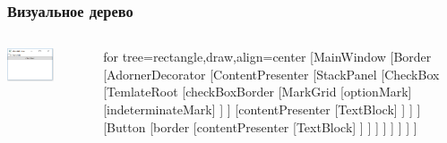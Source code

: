 \documentclass[xetex,mathserif,serif]{beamer}
\begin{document}
	\begin{frame}
		\frametitle{Визуальное дерево}
		\begin{columns}
			\begin{column}{0.4\textwidth}
				\begin{center}
					\includegraphics[width=0.6\textwidth]{wpfApp.png}
				\end{center}
			\end{column}
			\begin{column}{0.6\textwidth}
				\begin{tiny}
					\begin{forest}
						for tree={rectangle,draw,align=center}
						[MainWindow
							[Border
								[AdornerDecorator
									[ContentPresenter
										[StackPanel
											[CheckBox
												[TemlateRoot
													[checkBoxBorder
														[MarkGrid
															[optionMark]
															[indeterminateMark]
														]
													]
													[contentPresenter
														[TextBlock]
													]
												]
											]
											[Button
												[border
													[contentPresenter
														[TextBlock]
													]
												]
											]
										]
									]
								]
							]
						]
					\end{forest}
				\end{tiny}
			\end{column}
		\end{columns}
	\end{frame}
\end{document}
